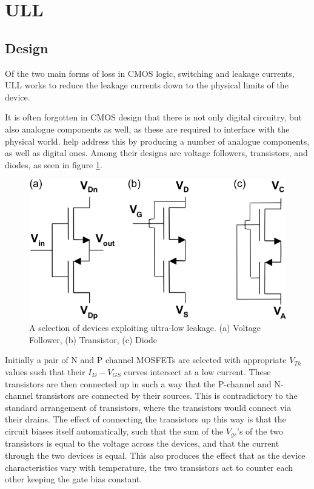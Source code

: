 \section{\acf{ULL}}
\label{sec:ull}

\subsection{Design}

Of the two main forms of loss in CMOS logic, switching and leakage currents, \ac{ULL} works to reduce the leakage currents down to the physical limits of the device.

It is often forgotten in CMOS design that there is not only digital circuitry, but also analogue components as well, as these are required to interface with the physical world.
\citeauthor{ULL-AandD} help address this by producing a number of analogue components, as well as digital ones.
Among their designs are voltage followers, transistors, and diodes, as seen in figure \ref{fig:ulldevices}.

\begin{figure}
	\centering
	\includegraphics[width=\columnwidth]{../../images/ULLdevices.png}
	\caption{A selection of devices exploiting ultra-low leakage. (a) Voltage Follower, (b) Transistor, (c) Diode \cite{DisruptiveULL}}
	\label{fig:ulldevices}
\end{figure}

Initially a pair of N and P channel MOSFETs are selected with appropriate $V_{Th}$ values such that their $I_{D}-V_{GS}$ curves intersect at a low current.
These transistors are then connected up in such a way that the P-channel and N-channel transistors are connected by their sources.
This is contradictory to the standard arrangement of transistors, where the transistors would connect via their drains.
The effect of connecting the transistors up this way is that the circuit biases itself automatically, such that the sum of the $V_{gs}$'s of the two transistors is equal to the voltage across the devices, and that the current through the two devices is equal.
This also produces the effect that as the device characteristics vary with temperature, the two transistors act to counter each other keeping the gate bias constant.


